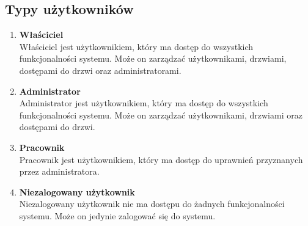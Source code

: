  \subsection{Typy użytkowników}
    \begin{enumerate}
        \item \textbf{Właściciel} \\
Właściciel jest użytkownikiem, który ma dostęp do wszystkich funkcjonalności systemu. Może on zarządzać użytkownikami, drzwiami, dostępami do drzwi oraz administratorami.


        \item \textbf{Administrator}\\
Administrator jest użytkownikiem, który ma dostęp do wszystkich funkcjonalności systemu. Może on zarządzać użytkownikami, drzwiami oraz dostępami do drzwi.       

        \item \textbf{Pracownik} \\
Pracownik jest użytkownikiem, który ma dostęp do uprawnień przyznanych przez administratora. 
        \item \textbf{Niezalogowany użytkownik} \\
Niezalogowany użytkownik nie ma dostępu do żadnych funkcjonalności systemu. Może on jedynie zalogować się do systemu.
    \end{enumerate}